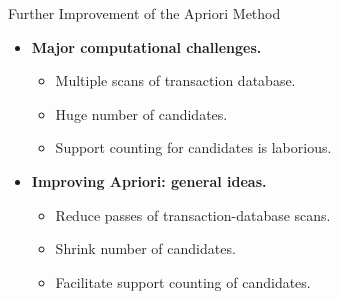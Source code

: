 \begin{frame}{Further Improvement of the Apriori Method}
	\begin{itemize}
		\item \textbf{Major computational challenges.}
		      \begin{itemize}
			      \item Multiple scans of transaction database.
			      \item Huge number of candidates.
			      \item Support counting for candidates is laborious.
		      \end{itemize}
		\item \textbf{Improving Apriori: general ideas.}
		      \begin{itemize}
			      \item Reduce passes of transaction-database scans.
			      \item Shrink number of candidates.
			      \item Facilitate support counting of candidates.
		      \end{itemize}
	\end{itemize}
\end{frame}

